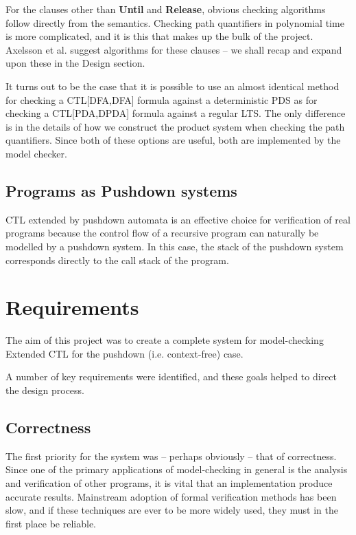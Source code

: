 \documentclass[11pt]{article}
\theoremstyle{definition}
\begin{document}
For the clauses other than \textbf{Until} and \textbf{Release}, obvious
checking algorithms follow directly from the semantics.  Checking path
quantifiers in polynomial time is more complicated, and it is this that makes
up the bulk of the project.  Axelsson et al. suggest algorithms for these
clauses\cite{Kreutzer10} -- we shall recap and expand upon these in the Design
section.

It turns out to be the case that it is possible to use an almost identical
method for checking a CTL[DFA,DFA] formula against a deterministic PDS as for
checking a CTL[PDA,DPDA] formula against a regular LTS. The only difference is
in the details of how we construct the product system when checking the path
quantifiers.  Since both of these options are useful, both are implemented by
the model checker.

\subsection{Programs as Pushdown systems}

CTL extended by pushdown automata is an effective choice for verification of
real programs because the control flow of a recursive program can naturally be
modelled by a pushdown system. In this case, the stack of the pushdown system
corresponds directly to the call stack of the program.

\section{Requirements}

The aim of this project was to create a complete system for model-checking
Extended CTL for the pushdown (i.e. context-free) case. 

A number of key requirements were identified, and these goals helped to direct
the design process. 

\subsection{Correctness}

The first priority for the system was -- perhaps obviously -- that of
correctness. Since one of the primary applications of model-checking in general
is the analysis and verification of other programs, it is vital that an
implementation produce accurate results. Mainstream adoption of formal
verification methods has been slow\cite{mitra2008strategies}, and if these
techniques are ever to be more widely used, they must in the first place be
reliable.
\end{document}
